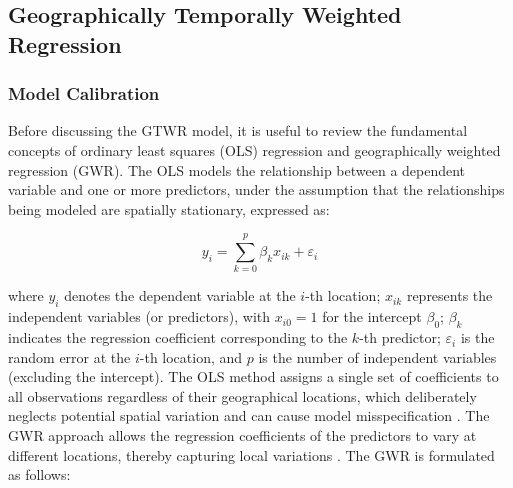 

\subsection{Geographically Temporally Weighted Regression}
\label{subsec:gtwr}


\subsubsection{Model Calibration}
\label{subsec:gtwr_calib}
%
%
Before discussing the GTWR model, it is useful to review the fundamental concepts of ordinary least squares (OLS) regression and geographically weighted regression (GWR). The OLS models the relationship between a dependent variable and one or more predictors, under the assumption that the relationships being modeled are spatially stationary, expressed as:

\begin{equation}
	y_i = \sum_{k=0}^{p} \beta_k x_{ik} + \varepsilon_i
	\label{eq:ols}
\end{equation}

\noindent where \(y_i\) denotes the dependent variable at the \(i\)-th location; \(x_{ik}\) represents the independent variables (or predictors), with \(x_{i0} = 1\) for the intercept \(\beta_0\); \(\beta_k\) indicates the regression coefficient corresponding to the \(k\)-th predictor; \(\varepsilon_i\) is the random error at the \(i\)-th location, and \(p\) is the number of independent variables (excluding the intercept).
%
The OLS method assigns a single set of coefficients to all observations regardless of their geographical locations, which deliberately neglects potential spatial variation and can cause model misspecification \citet{mgwr_book_2017}.
%
%
The GWR approach allows the regression coefficients of the predictors to vary at different locations, thereby capturing local variations \citep{brunsdon1996, fotheringham2002geographically}. The GWR is formulated as follows:


